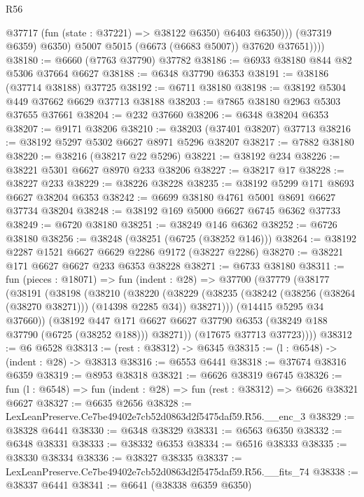 \begin{lexlean}{R56}
\begin{coremodule}
                  @37717 (fun (state : @37221) => @38122 @6350) @6403 @6350)))
              (@37319 @6359)
              @6350)
            @5007
            @5015
            (@6673 (@6683 @5007))
            @37620
            @37651))))
@38180 := @6660 (@7763 @37790) @37782
@38186 := @6933 @38180 @844 @82 @5306 @37664 @6627
@38188 := @6348 @37790 @6353
@38191 := @38186 (@37714 @38188) @37725
@38192 := @6711 @38180
@38198 := @38192 @5304 @449 @37662 @6629 @37713 @38188
@38203 := @7865 @38180 @2963 @5303 @37655 @37661
@38204 := @232 @37660
@38206 := @6348 @38204 @6353
@38207 := @9171 @38206
@38210 := @38203 (@37401 @38207) @37713
@38216 := @38192 @5297 @5302 @6627 @8971 @5296 @38207
@38217 := @7882 @38180
@38220 := @38216 (@38217 @22 @5296)
@38221 := @38192 @234
@38226 := @38221 @5301 @6627 @8970 @233 @38206
@38227 := @38217 @17
@38228 := @38227 @233
@38229 := @38226 @38228
@38235 := @38192 @5299 @171 @8693 @6627 @38204 @6353
@38242 := @6699 @38180 @4761 @5001 @8691 @6627 @37734 @38204
@38248 := @38192 @169 @5000 @6627 @6745 @6362 @37733
@38249 := @6720 @38180
@38251 := @38249 @146 @6362
@38252 := @6726 @38180
@38256 := @38248 (@38251 (@6725 (@38252 @146)))
@38264 := @38192 @2287 @1521 @6627 @6629 @2286 @9172 (@38227 @2286)
@38270 := @38221 @171 @6627 @6627 @233 @6353 @38228
@38271 := @6733 @38180
@38311 := fun (pieces : @18071) =>
  fun (indent : @28) =>
  @37700
    (@37779
      (@38177
        (@38191
          (@38198
            (@38210
              (@38220
                (@38229
                  (@38235 (@38242 (@38256 (@38264 (@38270 @38271))) (@14398 @2285 @34)) @38271)))
              (@14415 @5295 @34 @37660))
            (@38192
              @447
              @171
              @6627
              @6627
              @37790
              @6353
              (@38249 @188 @37790 (@6725 (@38252 @188)))
              @38271))
          (@17675 @37713 @37723))))
@38312 := @6 @6528
@38313 := (rest : @38312) -> @6345
@38315 := (l : @6548) -> (indent : @28) -> @38313
@38316 := @6553 @6441
@38318 := @37674 @38316 @6359
@38319 := @8953 @38318
@38321 := @6626 @38319 @6745
@38326 := fun (l : @6548) => fun (indent : @28) => fun (rest : @38312) => @6626 @38321 @6627
@38327 := @6635 @2656
@38328 := LexLeanPreserve.Ce7be49402e7cb52d0863d2f5475daf59.R56.__enc_3
@38329 := @38328 @6441
@38330 := @6348 @38329
@38331 := @6563 @6350
@38332 := @6348 @38331
@38333 := @38332 @6353
@38334 := @6516 @38333
@38335 := @38330 @38334
@38336 := @38327 @38335
@38337 := LexLeanPreserve.Ce7be49402e7cb52d0863d2f5475daf59.R56.__fits_74
@38338 := @38337 @6441
@38341 := @6641 (@38338 @6359 @6350)

\end{coremodule}
\end{lexlean}
